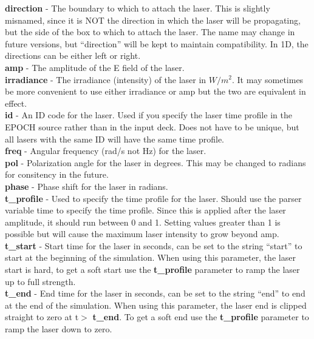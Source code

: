 \documentclass[12pt]{article}
\newcommand{\emphtext}{\color{warwickdark} \fontfamily{phv}\selectfont\Large\bf}
\newcommand{\inlineemph}[1]{{\color{warwicklight} \bf{#1}}}
\newcommand{\nEPOCH}{{\color{warwickdark}\fontfamily{phv}\selectfont EPOCH}}
\newcommand{\EPOCH}{{\nEPOCH} }
\begin{document}
{\emphtext direction} - The boundary to which to attach the laser. This is
slightly misnamed, since it is NOT the direction in which the laser will be
propagating, but the side of the box to which to attach the laser. The name may
change in future versions, but ``direction'' will be kept to maintain
compatibility. In 1D, the directions can be either left or right.\\

{\emphtext amp} - The amplitude of the E field of the laser.\\

{\emphtext irradiance} - The irradiance (intensity) of the laser in $W/m^2$. It
may sometimes be more convenient to use either irradiance or amp but the two
are equivalent in effect.\\

{\emphtext id} - An ID code for the laser. Used if you specify the laser time
profile in the \EPOCH source rather than in the input deck. Does not have to be
unique, but all lasers with the same ID will have the same time profile.\\

{\emphtext freq} - Angular frequency (rad/s not Hz) for the laser.\\

{\emphtext pol} - Polarization angle for the laser in degrees. This may be
changed to radians for consitency in the future. \\

{\emphtext phase} - Phase shift for the laser in radians.\\

{\emphtext t\_profile} - Used to specify the time profile for the laser. Should
use the parser variable time to specify the time profile. Since this is applied
after the laser amplitude, it should run between 0 and 1. Setting values
greater than 1 is possible but will cause the maximum laser intensity to grow
beyond amp.\\

{\emphtext t\_start} - Start time for the laser in seconds, can be set to the
string ``start'' to start at the beginning of the simulation. When using this
parameter, the laser start is hard, to get a soft start use the
\inlineemph{t\_profile} parameter to ramp the laser up to full strength.\\

{\emphtext t\_end} - End time for the laser in seconds, can be set to the
string ``end'' to end at the end of the simulation. When using this parameter,
the laser end is clipped straight to zero at t$>$\inlineemph{t\_end}. To get a
soft end use the \inlineemph{t\_profile} parameter to ramp the laser down to
zero.\\
\end{document}
